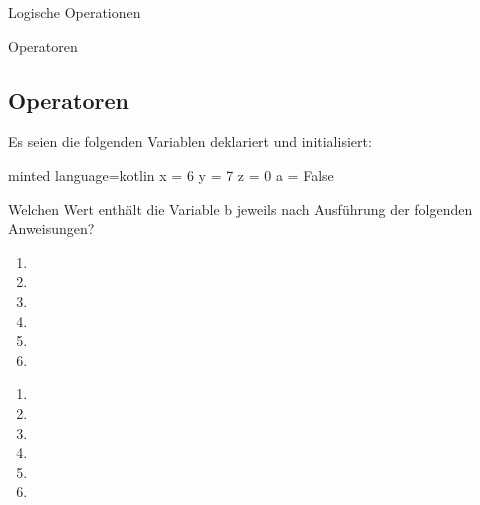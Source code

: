 \begin{task}[points=auto]{Logische Operationen }
    \begin{subtask*}[points=0]{Operatoren}
        \subsection{Operatoren}
        Es seien die folgenden Variablen deklariert und initialisiert:
        \begin{codeBlock}[]{minted language=kotlin}
            x = 6
            y = 7
            z = 0
            a = False
        \end{codeBlock}
        Welchen Wert enthält die Variable b jeweils nach Ausführung der folgenden Anweisungen?
        \begin{enumerate}
            \item {}
            \item {}
            \item {}
            \item {}
            \item {}
            \item {}
        \end{enumerate}

        \begin{solution}
            \begin{multicols}{3}
                \begin{enumerate}
                    \item {}
                    \item {}
                    \item {}
                    \item {}
                    \item {}
                    \item {}
                \end{enumerate}
            \end{multicols}
        \end{solution}
    \end{subtask*}
\end{task}
